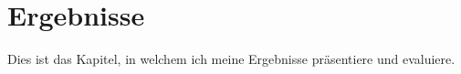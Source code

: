 \chapter{Ergebnisse} %
\label{Results} %

Dies ist das Kapitel, in welchem ich meine Ergebnisse präsentiere und evaluiere.